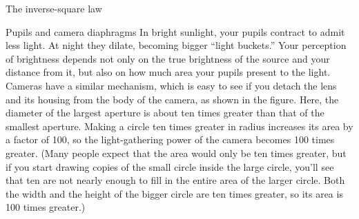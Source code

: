 \begin{envsubsection}{The inverse-square law}
\begin{eg}{Pupils and camera diaphragms}
In bright sunlight, your pupils contract to admit less light. At night they dilate,
becoming bigger ``light buckets.''
Your perception of brightness depends not only on the true brightness of the source
and your distance from it, but also on how much area your pupils present to the light.
Cameras have a similar mechanism, which is easy to see if you detach the lens
and its housing from the body of the camera, as shown in the figure. Here, the diameter of
the largest aperture is about ten times greater than that of the smallest aperture.
Making a circle ten times greater in radius increases its area by a factor of 100, so
the light-gathering power of the camera becomes 100 times greater. (Many people expect
that the area would only be ten times greater, but if you start drawing copies of the
small circle inside the large circle, you'll see that ten are not nearly enough to
fill in the entire area of the larger circle. Both the width and the height of the
bigger circle are ten times greater, so its area is 100 times greater.)
\end{eg}
\end{envsubsection}
%

